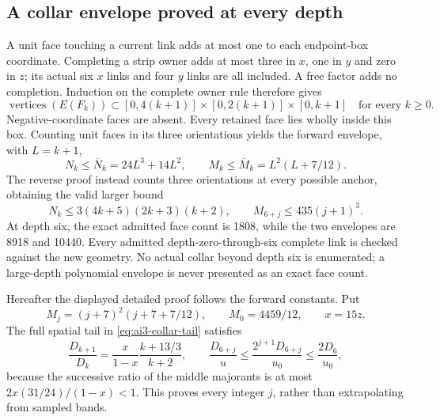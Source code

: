 \subsection{A collar envelope proved at every depth}
A unit face touching a current link adds at most one to each endpoint-box coordinate. Completing a strip owner adds at most three in $x$, one in $y$ and zero in $z$; its actual six $x$ links and four $y$ links are all included. A free factor adds no completion. Induction on the complete owner rule therefore gives
\begin{equation}
 \operatorname{vertices}(E(F_k))\subset
 [0,4(k+1)]\times[0,2(k+1)]\times[0,k+1]
 \quad\text{for every }k\ge0.
 \label{eq:ai4-geometry}
\end{equation}
Negative-coordinate faces are absent. Every retained face lies wholly inside this box. Counting unit faces in its three orientations yields the forward envelope, with $L=k+1$,
\begin{equation}
 N_k\le\overline N_k=24L^3+14L^2,\qquad
 M_k\le\overline M_k=L^2(L+7/12).
 \label{eq:ai4-forward-envelope}
\end{equation}
The reverse proof instead counts three orientations at every possible anchor, obtaining the valid larger bound
\begin{equation}
 N_k\le3(4k+5)(2k+3)(k+2),\qquad
 M_{6+j}\le435(j+1)^3.
 \label{eq:ai4-reverse-envelope}
\end{equation}
At depth six, the exact admitted face count is 1808, while the two envelopes are 8918 and 10440. Every admitted depth-zero-through-six complete link is checked against the new geometry. No actual collar beyond depth six is enumerated; a large-depth polynomial envelope is never presented as an exact face count.

Hereafter the displayed detailed proof follows the forward constants. Put
\begin{equation}
 M_j=(j+7)^2(j+7+7/12),\qquad M_0=4459/12,
 \qquad x=15z.
\end{equation}
The full spatial tail in \eqref{eq:ai3-collar-tail} satisfies
\begin{equation}
 \frac{D_{k+1}}{D_k}=\frac{x}{1-x}\frac{k+13/3}{k+2},\qquad
 \frac{D_{6+j}}u\le\frac{2^{j+1}D_{6+j}}{u_0}
 \le\frac{2D_6}{u_0},
 \label{eq:ai4-spatial-induction}
\end{equation}
because the successive ratio of the middle majorants is at most
$2x(31/24)/(1-x)<1$. This proves every integer $j$, rather than extrapolating from sampled bands.

